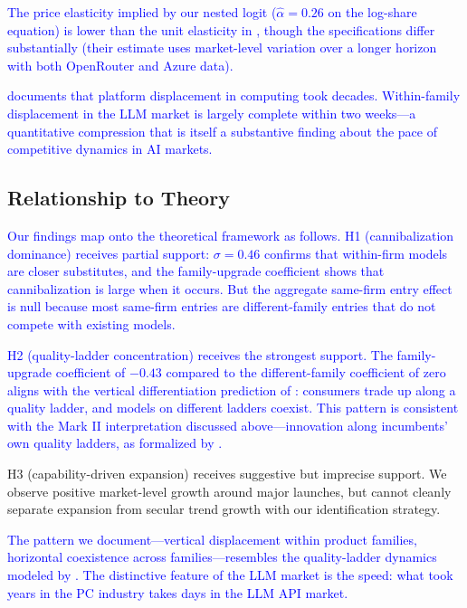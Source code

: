 \documentclass[11pt, a4paper]{article}
\begin{document}
\textcolor{blue}{The price elasticity implied by our nested logit ($\hat{\alpha} = 0.26$ on the log-share equation) is lower than the unit elasticity in \citet{demirer2025emerging}, though the specifications differ substantially (their estimate uses market-level variation over a longer horizon with both OpenRouter and Azure data).}

\textcolor{blue}{\citet{bresnahan1999technological} documents that platform displacement in computing took decades. Within-family displacement in the LLM market is largely complete within two weeks---a quantitative compression that is itself a substantive finding about the pace of competitive dynamics in AI markets.}

\subsection{Relationship to Theory}

\textcolor{blue}{Our findings map onto the theoretical framework as follows. H1 (cannibalization dominance) receives partial support: $\sigma = 0.46$ confirms that within-firm models are closer substitutes, and the family-upgrade coefficient shows that cannibalization is large when it occurs. But the aggregate same-firm entry effect is null because most same-firm entries are different-family entries that do not compete with existing models.}

\textcolor{blue}{H2 (quality-ladder concentration) receives the strongest support. The family-upgrade coefficient of $-0.43$ compared to the different-family coefficient of zero aligns with the vertical differentiation prediction of \citet{shaked1982relaxing}: consumers trade up along a quality ladder, and models on different ladders coexist. This pattern is consistent with the Mark II interpretation discussed above---innovation along incumbents' own quality ladders, as formalized by \citet{aghion1992model}.}

H3 (capability-driven expansion) receives suggestive but imprecise support. We observe positive market-level growth around major launches, but cannot cleanly separate expansion from secular trend growth with our identification strategy.

\textcolor{blue}{The pattern we document---vertical displacement within product families, horizontal coexistence across families---resembles the quality-ladder dynamics modeled by \citet{baron2020vertical}. The distinctive feature of the LLM market is the speed: what took years in the PC industry \citep{bresnahan2011schumpeterian} takes days in the LLM API market.}
\end{document}
